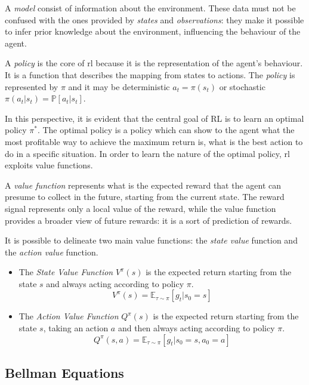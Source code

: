 A \textit{model} consist of information about the environment. These data must not be confused with the ones provided by \textit{states} and \textit{observations}: they make it possible to infer prior knowledge about the environment, influencing the behaviour of the agent.

A \textit{policy} is the core of \acrshort{rl} because it is the representation of the agent's behaviour. It is a function that describes the mapping from states to actions.  The \textit{policy} is represented by $\pi$ and it may be deterministic  $a_t = \pi(s_t)$  or stochastic $\pi(a_t|s_t) = \mathbb{P}[a_t | s_t]$.

In this perspective, it is evident that the central goal of RL is to learn an optimal policy $\pi^*$. The optimal policy is a policy which can show to the agent what the most profitable way to achieve the maximum return is, what is the best action to do in a specific situation. In order to learn the nature of the optimal policy, \acrshort{rl} exploits value functions.

A \textit{value function} represents what is the expected reward that the agent can presume to collect in the future, starting from the current state. The reward signal represents only a local value of the reward, while the value function provides a broader view of future rewards: it is a sort of prediction of rewards.

It is possible to delineate two main value functions: the \textit{state value} function and the \textit{action value} function.

\begin{itemize}
	\item The \textit{State Value Function} $V^\pi(s)$ is the expected return starting from the state $s$ and always acting according to policy $\pi$.
	\begin{equation} \label{eq:statevalue}
		V^\pi(s) = \mathbb{E}_{\tau \sim \pi}[g_t | s_0 = s]
	\end{equation}
	\item The \textit{Action Value Function} $Q^\pi(s)$ is the expected return starting from the state $s$, taking an action $a$ and then always acting according to policy $\pi$.
	\begin{equation} \label{eq:actionvalue}
	Q^\pi(s, a) = \mathbb{E}_{\tau \sim \pi}[g_t | s_0 = s, a_0 = a]
	\end{equation}
\end{itemize}


\subsection{Bellman Equations}

